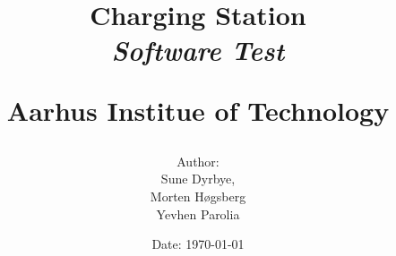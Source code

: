 \newcommand{\authorName}{Morten Høgsberg}
\newcommand{\titleName}{Charging Station}
\newcommand{\subject}{Software Test}
\newcommand{\institute}{Aarhus Institue of Technology}
\begin{titlepage}
  \centering
    \title
    {
      \Huge \textbf{\titleName}\\
      \scale{\numberSQRTTWO}{\vspace{\sol pt}}
      \LARGE \textit{\subject}
      \scale{\numberSQRTTWO}{\rule{\linewidth}{\sol pt}}

      \textbf{\institute}
      \author
    {
      \LARGE Author: \\ Sune Dyrbye, \\ Morten Høgsberg \\Yevhen Parolia
    }
      \date{\LARGE Date: \today}
    }
\end{titlepage}
